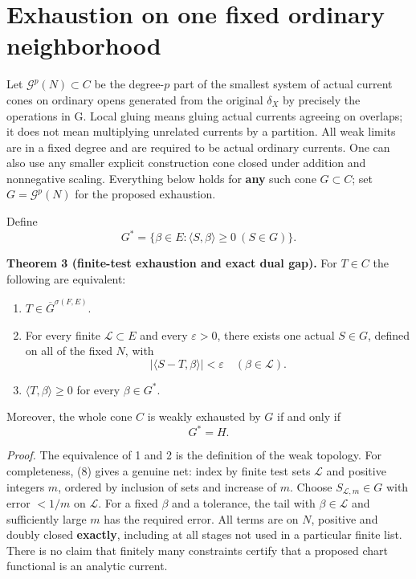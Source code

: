 \documentclass[
  11pt,
]{article}
\providecommand{\tightlist}{%
  \setlength{\itemsep}{0pt}\setlength{\parskip}{0pt}}
\begin{document}
\section{Exhaustion on one fixed ordinary
neighborhood}\label{exhaustion-on-one-fixed-ordinary-neighborhood}

Let \(\mathcal G^p(N)\subset C\) be the degree-\(p\) part of the
smallest system of actual current cones on ordinary opens generated from
the original \(\delta_X\) by precisely the operations in G. Local gluing
means gluing actual currents agreeing on overlaps; it does not mean
multiplying unrelated currents by a partition. All weak limits are in a
fixed degree and are required to be actual ordinary currents. One can
also use any smaller explicit construction cone closed under addition
and nonnegative scaling. Everything below holds for \textbf{any} such
cone \(G\subset C\); set \(G=\mathcal G^p(N)\) for the proposed
exhaustion.

Define \[G^*=\{\beta\in E:\langle S,\beta\rangle\geq0\ (S\in G)\}.\]

\textbf{Theorem 3 (finite-test exhaustion and exact dual gap).} For
\(T\in C\) the following are equivalent:

\begin{enumerate}
\def\labelenumi{\arabic{enumi}.}
\tightlist
\item
  \(T\in\overline G^{\sigma(F,E)}\).
\item
  For every finite \(\mathcal L\subset E\) and every \(\varepsilon>0\),
  there exists one actual \(S\in G\), defined on all of the fixed \(N\),
  with
  \[|\langle S-T,\beta\rangle|<\varepsilon\quad(\beta\in\mathcal L). \tag{8}\]
\item
  \(\langle T,\beta\rangle\geq0\) for every \(\beta\in G^*\).
\end{enumerate}

Moreover, the whole cone \(C\) is weakly exhausted by \(G\) if and only
if \[                       G^*=H.                             \tag{9}\]

\emph{Proof.} The equivalence of 1 and 2 is the definition of the weak
topology. For completeness, (8) gives a genuine net: index by finite
test sets \(\mathcal L\) and positive integers \(m\), ordered by
inclusion of sets and increase of \(m\). Choose
\(S_{\mathcal L,m}\in G\) with error \(<1/m\) on \(\mathcal L\). For a
fixed \(\beta\) and a tolerance, the tail with \(\beta\in\mathcal L\)
and sufficiently large \(m\) has the required error. All terms are on
\(N\), positive and doubly closed \textbf{exactly}, including at all
stages not used in a particular finite list. There is no claim that
finitely many constraints certify that a proposed chart functional is an
analytic current.
\end{document}
